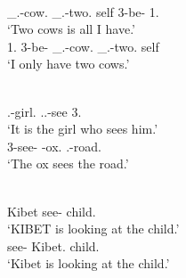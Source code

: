 \pagebreak
\begin{exe}\ex\label{TurEmph}
\begin{xlist}
\ex\gll{}    \\
\Non\_{}\neu{}.\pl{}-cow.\acc{} \Non{}\_\neu{}.\pl{}-two.\acc{} self 3-be-\pl{} 1\sg{}.\acc{}\\
\glt `Two cows is all I have.'
\ex\gll{}    \\
1\sg{}.\acc{} 3-be-\pl{} \Non{}\_\neu{}.\pl{}-cow.\nom{}  \Non{}\_\neu{}.\pl{}-two.\nom{} self\\
\glt `I only have two cows.'
\end{xlist} 
\end{exe}

\begin{exe}
\ex \label{MaaEmph}
\begin{xlist}
\ex\gll {}  \\
\fem{}.\sg{}-girl.\acc{} \relativ{}.\fem{}.\sg{}-see 3\sg{}.\acc{}\\
\glt `It is the girl who sees him.'
\ex\gll {}  \\
3\sg{}-see-\prog{} \mas{}\sg{}-ox.\nom{} \fem{}.\sg{}-road.\acc{}\\
\glt `The ox sees the road.'
\end{xlist}
\end{exe}


%

\begin{exe}\ex\label{NanEmph}
\begin{xlist}
\ex\gll {}   \\
Kibet \partic{} see-\ipfv{} child.\acc{}\\
\glt `{KIBET} is looking at the child.'
\ex\gll{}  \\
see-\ipfv{} Kibet.\nom{} child.\acc{}\\
\glt `Kibet is looking at the child.'
\end{xlist} 
\end{exe} 

